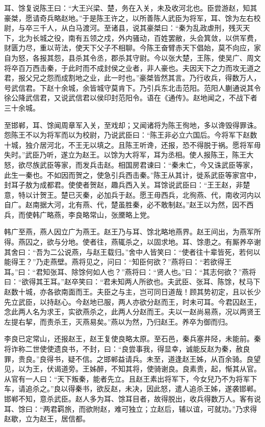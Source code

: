 \documentclass[12pt,UTF8]{ctexbook}
\begin{document}
耳、馀复说陈王曰：“大王兴梁、楚，务在入关，未及收河北也。臣尝游赵，知其豪桀，愿请奇兵略赵地。”于是陈王许之，以所善陈人武臣为将军，耳、馀为左右校尉，与卒三千人，从白马渡河。至诸县，说其豪桀曰：“秦为乱政虐刑，残灭天下，北为长城之役，南有五领之戍，外内骚动，百姓罢敝，头会箕敛，以供军费，财匮力尽，重以苛法，使天下父子不相聊。今陈王奋臂赤天下倡始，莫不向应，家自为怒，各报其怨，县杀其令丞，郡杀其守尉。今以张大楚，王陈，使吴广、周文将卒百万西击秦，于此时而不成封侯之业者，非人豪也。夫因天下之力而攻无道之君，报父兄之怨而成割地之业，此一时也。”豪桀皆然其言。乃行收兵，得数万人，号武信君。下赵十余城，余皆城守莫肯下。乃引兵东北击范阳。范阳人蒯通说其令徐公降武信君，又说武信君以侯印封范阳令。语在《通传》。赵地闻之，不战下者三十余城。



至邯郸，耳、馀闻周章军入关，至戏却；又闻诸将为陈王徇地，多以谗毁得罪诛。怨陈王不以为将军而以为校尉，乃说武臣曰：“陈王非必立六国后。今将军下赵数十城，独介居河北，不王无以填之。且陈王听谗，还报，恐不得脱于祸。愿将军毋失时。”武臣乃听，遂立为赵王。以馀为大将军，耳为丞相。使人报陈王，陈王大怒，欲尽族武臣等家，而发兵击赵。相国房君谏曰：“秦未亡，今又诛武臣等家，此生一秦也。不如因而贺之，使急引兵西击秦。”陈王从其计，徙系武臣等家宫中，封耳子敖为成都君。使使者贺赵，趣兵西入关。耳馀说武臣曰：“王王赵，非楚意，特以计贺王。楚已灭秦，必加兵于赵。愿王毋西兵，北徇燕、代，南收河内以自广。赵南据大河，北有燕、代，楚虽胜秦，必不敢制赵。”赵王以为然，因不西兵，而使韩广略燕，李良略常山，张黡略上党。



韩广至燕，燕人因立广为燕王。赵王乃与耳、馀北略地燕界。赵王间出，为燕军所得。燕囚之，欲与分地。使者往，燕辄杀之，以固求地。耳、馀患之。有厮养卒谢其舍曰：“吾为二公说燕，与赵王载归。”舍中人皆笑曰：“使者往十辈皆死，若何以能得王？”乃走燕壁。燕将见之，问曰：“知臣何欲？”燕将曰：“若欲得王耳。”曰：“君知张耳、除馀何如人也？”燕将曰：“贤人也。”曰：“其志何欲？”燕将曰：“欲得其王耳。”赵卒笑曰：“君未知两人所欲也。夫武臣、张耳、陈馀，杖马下赵数十城，亦各欲南面而王。夫臣之与主，岂可同日道哉！顾其势初定，且以长少先立武臣，以持赵心。今赵地已服，两人亦欲分赵而王，时未可耳。今君囚赵王，念此两人名为求王，实欲燕杀之，此两人分赵而王。夫以一赵尚易燕，况以两贤王左提右挈，而责杀王，灭燕易矣。”燕以为然，乃归赵王。养卒为御而归。



李良已定常山，还报赵王，赵王复使良略太原。至石邑，秦兵塞井陉，未能前。秦将诈称二世使使遗良书，不封，曰：“良尝事我，得显幸，诚能反赵为秦，赦良罪，贵良。”良得书，疑不信。之邯郸益请兵。未至，道逢赵王姊，从百余骑。良望见，以为王，伏谒道旁。王姊醉，不知其将，使骑谢良。良素贵，起，惭其从官。从官有一人曰：“天下叛秦，能者先立。且赵王素出将军下，今女兒乃不为将军下车，请追杀之。”良以得秦书，欲反赵，未决，因此怒，遣人追杀王姊，遂袭邯郸。邯郸不知，意杀武臣。赵人多为耳、馀耳目者，故得脱出，收兵得数万人。客有说耳、馀曰：“两君羁旅，而欲附赵，难可独立；立赵后，辅以谊，可就功。”乃求得赵歇，立为赵王，居信都。
\end{document}
